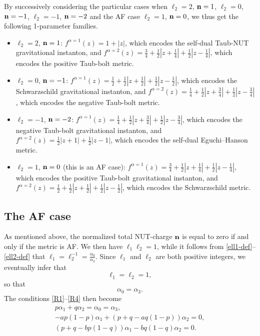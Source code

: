\documentclass[10pt,a4paper]{amsart}
\numberwithin{equation}{section}
\begin{document}
By successively considering the particular cases when $\ell _2 = 2$, ${\bf n} = 1$, $\ell _2 = 0$, ${\bf n} = - 1$, $\ell _2 = - 1$, ${\bf n} = - 2$ and the AF case $\ell _2 = 1$, ${\bf n} = 0$, we thus get the following 1-parameter families.
\begin{itemize}\itemsep=0pt
 \item[(i)] $\ell _2 = 2$, ${\bf n} = 1$: $f^{\alpha = 1} (z) = 1 + |z|$, which encodes the self-dual Taub-NUT gravitational instanton, and $f ^{\alpha = 2} (z) = \frac{3}{4} + \frac{1}{2} |z + \frac{1}{4}| + \frac{1}{2} |z - \frac{1}{4}|$, which encodes the positive Taub-bolt metric.
\item[(ii)] $\ell _2 = 0$, ${\bf n} = - 1$: $f^{\alpha = 1} (z) = \frac{1}{2} + \frac{1}{2} |z + \frac{1}{2}| + \frac{1}{2} |z - \frac{1}{2}|$, which encodes the Schwarzschild gravitational instanton, and $f^{\alpha = 2} (z) = \frac{1}{4} + \frac{1}{2} |z + \frac{3}{4}| + \frac{1}{2} |z - \frac{3}{4}|$, which encodes the negative Taub-bolt metric.
\item[(iii)] $\ell _2 = - 1$, ${\bf n} = - 2$: $f^{\alpha = 1} (z) = \frac{1}{4} + \frac{1}{2} |z + \frac{3}{4}| + \frac{1}{2} |z - \frac{3}{4}|$, which encodes the negative Taub-bolt gravitational instanton, and $f^{\alpha = 2} (z) = \frac{1}{2} |z + 1| + \frac{1}{2} |z - 1|$, which encodes the self-dual Eguchi--Hanson metric.
\item[(iv)] $\ell _2 = 1$, ${\bf n} = 0$ (this is an AF case): $f^{\alpha = 1} (z) = \frac{3}{4} + \frac{1}{2} |z + \frac{1}{4}| + \frac{1}{2} |z - \frac{1}{4}|$, which encodes the positive Taub-bolt gravitational instanton, and $f^{\alpha = 2} (z) = \frac{1}{2} + \frac{1}{2} |z + \frac{1}{2}| + \frac{1}{2} |z - \frac{1}{2}|$, which encodes the Schwarzschild metric.
\end{itemize}




\subsection{The AF case} \label{ss-AF}
As mentioned above, the normalized total NUT-charge ${\bf n}$ is equal to zero if and only if the metric is AF. We then have $\ell _1 \ell_2 = 1$, while it follows from \eqref{ell1-def}--\eqref{ell2-def} that $\ell _1 = \ell _2 ^{-1} = \frac{\alpha _0}{\alpha _3}$. Since $\ell _1$ and $\ell _2$ are both positive integers, we eventually infer that
\[ \ell _1 = \ell _2 = 1, \]
so that
\[ \alpha _0 = \alpha _3. \]
The conditions \eqref{R1}--\eqref{R4} then become
\begin{gather*}%
p \alpha _1 + q \alpha _2 = \alpha _0 = \alpha _3, \\
 - a p (1 - p) \alpha _1 + (p + q - a q (1 - p)) \alpha _2 = 0, \\
 (p + q - b p (1 - q)) \alpha _1 - b q (1 - q) \alpha _2 = 0. \end{gather*}
\end{document}
